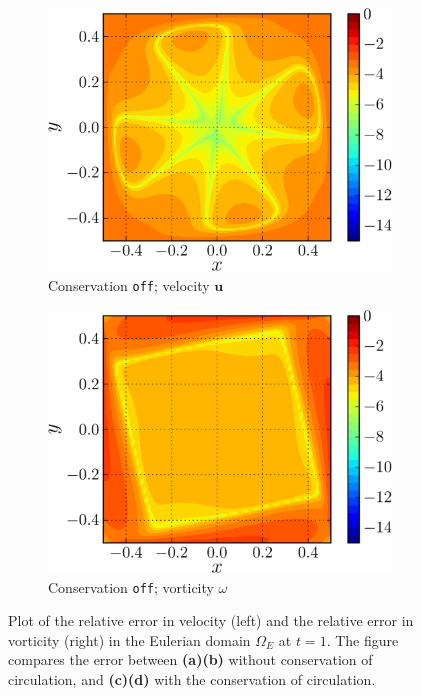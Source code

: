 \begin{figure}[!t]
     \begin{subfigure}[t]{0.45\textwidth}
             \includegraphics[width=\linewidth]{./figures/hybrid/lambOseent2/lambOseen_fullyCoff_vErrorFinal_compressed-crop.png}
             \caption{Conservation \texttt{off}; velocity $\mathbf{u}$}
             \label{fig:lambOseen_fullyCoff_vErrorFinal}
     \end{subfigure}
     \qquad     
     \begin{subfigure}[t]{0.45\textwidth}
             \includegraphics[width=\linewidth]{./figures/hybrid/lambOseent2/lambOseen_fullyCoff_wErrorFinal_compressed-crop.png}
             \caption{Conservation \texttt{off}; vorticity $\omega$}
             \label{fig:lambOseen_fullyCoff_wErrorFinal}
     \end{subfigure}  
  
     \caption{Plot of the relative error in velocity (left) and the relative error in vorticity (right) in the Eulerian domain $\Omega_E$ at $t=1$. The figure compares the error between \textbf{(a)}\textbf{(b)} without conservation of circulation, and \textbf{(c)}\textbf{(d)} with the conservation of circulation.}
     \label{fig:lambOseen_conservation_contourf}
	\end{figure}
	
